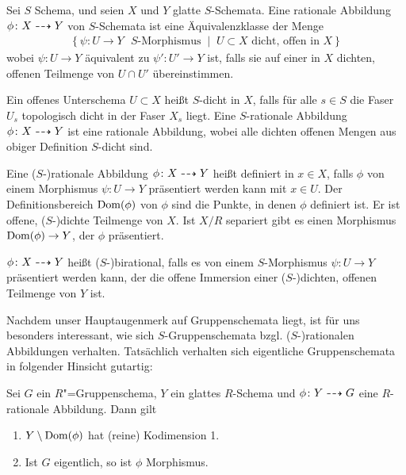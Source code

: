 \begin{Definition}\label{def:ratabb}
  Sei $S$ Schema, und seien $X$ und $Y$ glatte $S$-Schemata.
  Eine rationale Abbildung $\phi\colon X\dashrightarrow Y$ von
  $S$-Schemata ist eine Äquivalenzklasse der Menge
  \begin{gather*}
    \left\{
      \psi\colon U\to Y \text{ $S$-Morphismus}
      \;\middle|\;
      U\subset X \text{ dicht, offen in $X$}
    \right\}
  \end{gather*}
  wobei $\psi\colon U\to Y$ äquivalent zu $\psi'\colon U'\to Y$ ist,
  falls sie auf einer in $X$ dichten, offenen Teilmenge von $U\cap U'$
  übereinstimmen.
  
  Ein offenes Unterschema $U\subset X$ heißt $S$-dicht in $X$,
  falls für alle $s\in S$ die Faser $U_s$ %
  topologisch dicht in der Faser $X_s$ %
  liegt.
  Eine $S$-rationale Abbildung $\phi\colon X\dashrightarrow Y$ ist eine
  rationale Abbildung, wobei alle dichten offenen Mengen aus obiger
  Definition $S$-dicht sind.

  Eine ($S$-)rationale Abbildung $\phi\colon X\dashrightarrow Y$ heißt definiert
  in $x\in X$, falls $\phi$ von einem Morphismus $\psi\colon U\to Y$
  präsentiert werden kann mit $x\in U$.
  Der Definitionsbereich $\operatorname{Dom}(\phi)$ von $\phi$ sind die
  Punkte, in denen $\phi$ definiert ist. Er ist offene, ($S$-)dichte
  Teilmenge von $X$. Ist $X/R$ separiert gibt es einen Morphismus
  $\operatorname{Dom}(\phi)\to Y$, der $\phi$ präsentiert.
  
  $\phi\colon X\dashrightarrow Y$ heißt ($S$-)birational, falls es von einem
  $S$-Morphismus $\psi\colon U\to Y$ präsentiert werden kann, der
  die offene Immersion einer ($S$-)dichten, offenen Teilmenge von $Y$
  ist.
\end{Definition}

Nachdem unser Hauptaugenmerk auf Gruppenschemata liegt, ist für uns
besonders interessant, wie sich $S$-Gruppenschemata
bzgl. ($S$-)rationalen Abbildungen verhalten.
Tatsächlich verhalten sich eigentliche Gruppenschemata in folgender
Hinsicht gutartig:
\begin{Lemma}
  \label{thm:rationalzumorphismus}
  Sei $G$ ein $R$"=Gruppenschema, $Y$ ein glattes $R$-Schema und
  $\phi\colon Y\dashrightarrow G$ eine $R$-rationale Abbildung.
  Dann gilt
  \begin{enumerate}[label=(\roman*)]
  \item $Y\setminus \operatorname{Dom}(\phi)$ hat (reine) Kodimension 1.
  \item Ist $G$ eigentlich, so ist $\phi$ Morphismus.
  \end{enumerate}
\end{Lemma}

